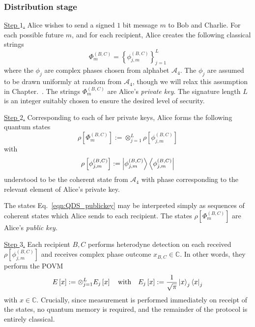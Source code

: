 

\subsubsection{Distribution stage}
\noindent \underline{Step $1$.} Alice wishes to send a signed $1$ bit message $m$ to Bob and Charlie. For each possible future $m$, and for each recipient, Alice creates the following classical strings
\begin{equation}
\Phi_m^{\left(B, C\right)} = \left\{ \phi_{j, m}^{\left(B, C\right)}\right\}_{j=1}^{L}
\end{equation}
where the $\phi_{j}$ are complex phases chosen from alphabet $\mathcal{A}_4$. The $\phi_j$ are assumed to be drawn uniformly at random from $\mathcal{A}_4$, though we will relax this assumption in Chapter.~. The strings $\Phi_m^{\left(B, C\right)}$ are Alice's \emph{private key}.  The signature length $L$ is an integer suitably chosen to ensure the desired level of security.
\par
\noindent \underline{Step $2$.} Corresponding to each of her private keys, Alice forms the following quantum states
\begin{equation}\label{eqn:QDS_publickey}
\rho\left[\Phi_m^{\left(B, C\right)}\right] := \otimes_{j=1}^L \rho\left[\phi_{j, m}^{\left(B, C\right)}\right]
\end{equation}
with
\begin{equation}
\rho\left[\phi_{j, m}^{\left(B, C\right)}\right] := \ket{\phi_{j, m}^{\left(B, C\right)}} \bra{\phi_{j, m}^{\left(B, C\right)}}
\end{equation}
understood to be the coherent state from $\mathcal{A}_4$ with phase corresponding to the relevant element of Alice's private key.

The states Eq.~\ref{eqn:QDS_publickey} may be interpreted simply as sequences of coherent states which Alice sends to each recipient. The states $\rho\left[\Phi_m^{\left(B, C\right)}\right]$ are Alice's \emph{public key}. 
\par
\noindent \underline{Step $3$.} Each recipient $B, C$ performs heterodyne detection on each received $\rho\left[\phi_{j, m}^{\left(B, C\right)}\right]$ and receives complex phase outcome $x_{B,C}\in\mathbb{C}$. In other words, they perform the POVM
\begin{equation}
E\left[x\right] := \otimes_{j=1}^L E_j\left[x\right] \qq{with} E_j\left[x\right] := \frac{1}{\sqrt{\pi}} \ket{x}_j\bra{x}_j
\end{equation}
with $x \in \mathbb{C}$. Crucially, since measurement is performed immediately on receipt of the states, no quantum memory is required, and the remainder of the protocol is entirely classical.

